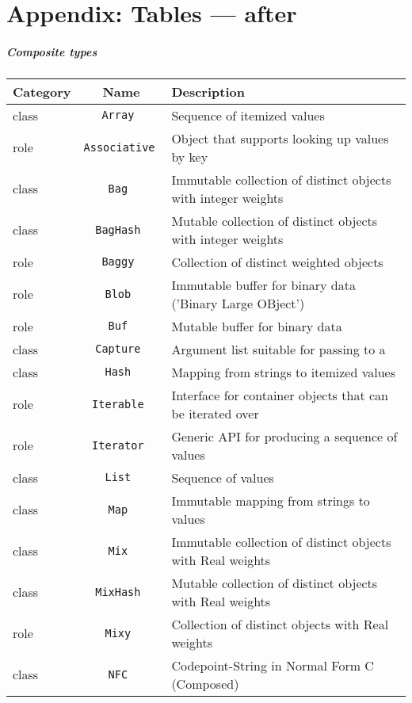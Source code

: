 \documentclass[17pt,english]{extarticle}
\providecommand{\tabularnewline}{\\}
\begin{document}
\newpage{}
\nocite{*}

\newpage{}


\part*{Appendix: Tables — after \citealp{Documentation}}


\subsubsection*{Composite types}

\begin{longtable}{|>{\centering}p{}|c|>{\centering}p{}}
\hline 
Category &
Name &
Description\tabularnewline
\hline 
\hline 
class  &
\texttt{Array } &
Sequence of itemized values\tabularnewline
\hline 
\hline 
role  &
\texttt{Associative } &
Object that supports looking up values by key\tabularnewline
\hline 
\hline 
class  &
\texttt{Bag } &
Immutable collection of distinct objects with integer weights\tabularnewline
\hline 
\hline 
class  &
\texttt{BagHash } &
Mutable collection of distinct objects with integer weights\tabularnewline
\hline 
\hline 
role  &
\texttt{Baggy } &
Collection of distinct weighted objects\tabularnewline
\hline 
\hline 
role  &
\texttt{Blob } &
Immutable buffer for binary data ('Binary Large OBject')\tabularnewline
\hline 
\hline 
role  &
\texttt{Buf } &
Mutable buffer for binary data\tabularnewline
\hline 
\hline 
class  &
\texttt{Capture } &
Argument list suitable for passing to a\tabularnewline
\hline 
\hline 
class  &
\texttt{Hash } &
Mapping from strings to itemized values\tabularnewline
\hline 
\hline 
role  &
\texttt{Iterable } &
Interface for container objects that can be iterated over\tabularnewline
\hline 
\hline 
role  &
\texttt{Iterator } &
Generic API for producing a sequence of values\tabularnewline
\hline 
\hline 
class  &
\texttt{List } &
Sequence of values\tabularnewline
\hline 
\hline 
class  &
\texttt{Map } &
Immutable mapping from strings to values\tabularnewline
\hline 
\hline 
class  &
\texttt{Mix } &
Immutable collection of distinct objects with Real weights\tabularnewline
\hline 
\hline 
class  &
\texttt{MixHash } &
Mutable collection of distinct objects with Real weights\tabularnewline
\hline 
\hline 
role  &
\texttt{Mixy } &
Collection of distinct objects with Real weights\tabularnewline
\hline 
\hline 
class  &
\texttt{NFC } &
Codepoint-String in Normal Form C (Composed)\tabularnewline

\end{longtable}
\end{document}
